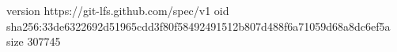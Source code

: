 version https://git-lfs.github.com/spec/v1
oid sha256:33de6322692d51965cdd3f80f58492491512b807d488f6a71059d68a8dc6ef5a
size 307745
